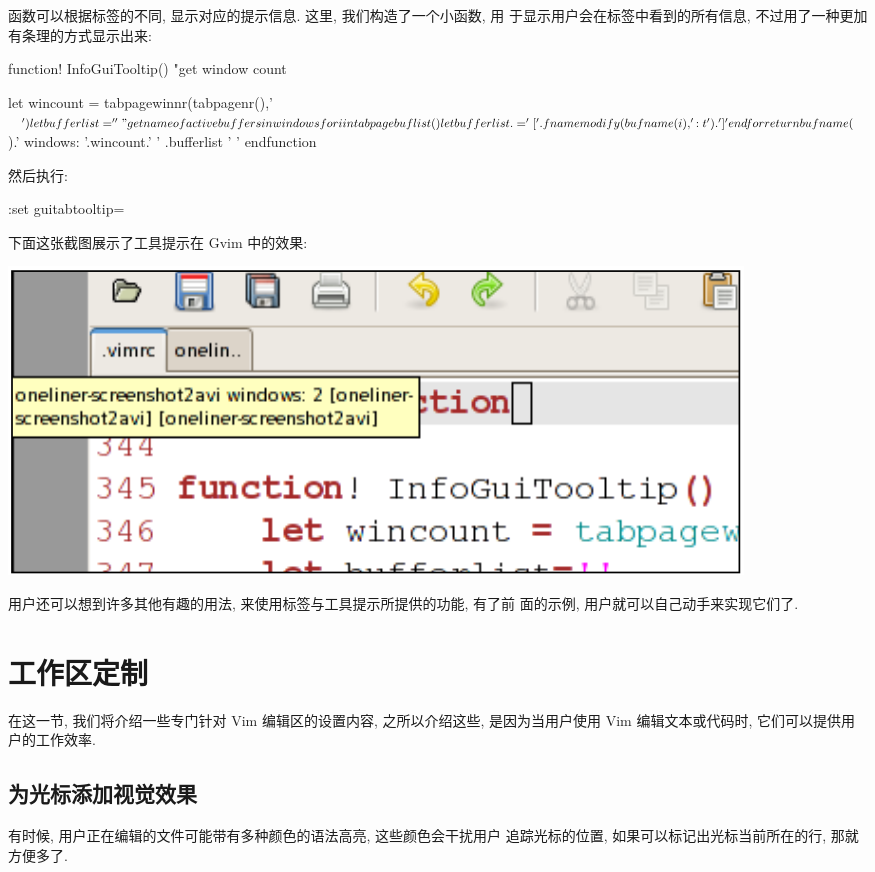 函数可以根据标签的不同, 显示对应的提示信息. 这里, 我们构造了一个小函数, 用
于显示用户会在标签中看到的所有信息, 不过用了一种更加有条理的方式显示出来:
\begin{vimscript}
function! InfoGuiTooltip()
    "get window count
\end{vimscript}
\begin{vimscript}
    let wincount = tabpagewinnr(tabpagenr(),'$')
    let bufferlist=''
   "get name of active buffers in windows
    for i in tabpagebuflist()
        let bufferlist .= '['.fnamemodify(bufname(i),':t').'] ' 
    endfor
    return bufname($).' windows: '.wincount.' ' .bufferlist ' '
endfunction
\end{vimscript}
然后执行:
\begin{vimcmd}
:set guitabtooltip=%
\end{vimcmd}
下面这张截图展示了工具提示在 Gvim 中的效果:
\begin{center}
    \includegraphics[scale=0.6]{images/page37.png}
\end{center}

用户还可以想到许多其他有趣的用法, 来使用标签与工具提示所提供的功能, 有了前
面的示例, 用户就可以自己动手来实现它们了.

\section{工作区定制}
\label{sec:work_area_personalization}

在这一节, 我们将介绍一些专门针对 Vim 编辑区的设置内容, 之所以介绍这些,
是因为当用户使用 Vim 编辑文本或代码时, 它们可以提供用户的工作效率.

\subsection{为光标添加视觉效果}
\label{subsec:adding_a_more_visual_cursor}
有时候, 用户正在编辑的文件可能带有多种颜色的语法高亮, 这些颜色会干扰用户
追踪光标的位置, 如果可以标记出光标当前所在的行, 那就方便多了.

